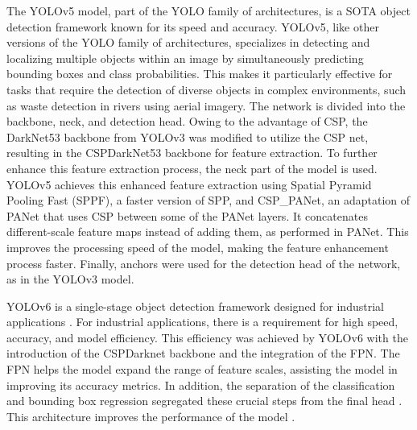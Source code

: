 \documentclass{ieeeaccess}
\begin{document}
The YOLOv5 model, part of the YOLO family of architectures, is a SOTA object detection framework known for its speed and accuracy. YOLOv5, like other versions of the YOLO family of architectures, specializes in detecting and localizing multiple objects within an image by simultaneously predicting bounding boxes and class probabilities. This makes it particularly effective for tasks that require the detection of diverse objects in complex environments, such as waste detection in rivers using aerial imagery. The network is divided into the backbone, neck, and detection head. Owing to the advantage of CSP, the DarkNet53 backbone from YOLOv3 \cite{Redmon2018YOLOv3AI} was modified to utilize the CSP net, resulting in the CSPDarkNet53 backbone for feature extraction. To further enhance this feature extraction process, the neck part of the model is used. YOLOv5 achieves this enhanced feature extraction using Spatial Pyramid Pooling Fast (SPPF), a faster version of SPP, and CSP\_PANet, an adaptation of PANet that uses CSP between some of the PANet layers. It concatenates different-scale feature maps instead of adding them, as performed in PANet. This improves the processing speed of the model, making the feature enhancement process faster. Finally, anchors were used for the detection head of the network, as in the YOLOv3 model.

YOLOv6 is a single-stage object detection framework designed for industrial applications \cite{Li2022YOLOv6AS}. For industrial applications, there is a requirement for high speed, accuracy, and model efficiency. This efficiency was achieved by YOLOv6 with the introduction of the CSPDarknet backbone and the integration of the FPN. The FPN helps the model expand the range of feature scales, assisting the model in improving its accuracy metrics. In addition, the separation of the classification and bounding box regression segregated these crucial steps from the final head \cite{Wang2023MosaicRL}. This architecture improves the performance of the model \cite{Alif2024YOLOv1TY}. 
\end{document}
